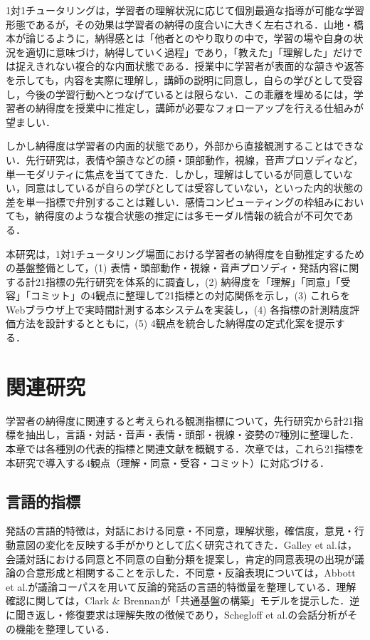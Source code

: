 \documentclass[Japanese]{dicomopapers}
\begin{document}
1対1チュータリングは，学習者の理解状況に応じて個別最適な指導が可能な学習形態であるが，その効果は学習者の納得の度合いに大きく左右される．山地・橋本\cite{Yamaji2012}が論じるように，納得感とは「他者とのやり取りの中で，学習の場や自身の状況を適切に意味づけ，納得していく過程」であり，「教えた」「理解した」だけでは捉えきれない複合的な内面状態である．授業中に学習者が表面的な頷きや返答を示しても，内容を実際に理解し，講師の説明に同意し，自らの学びとして受容し，今後の学習行動へとつなげているとは限らない．この乖離を埋めるには，学習者の納得度を授業中に推定し，講師が必要なフォローアップを行える仕組みが望ましい．

しかし納得度は学習者の内面的状態であり，外部から直接観測することはできない．先行研究は，表情や頷きなどの顔・頭部動作\cite{Craig2008}，視線\cite{Kendon1967}，音声プロソディ\cite{PonBarry2008}など，単一モダリティに焦点を当ててきた．しかし，理解はしているが同意していない，同意はしているが自らの学びとしては受容していない，といった内的状態の差を単一指標で弁別することは難しい．感情コンピューティング\cite{Picard1997}の枠組みにおいても，納得度のような複合状態の推定には多モーダル情報の統合が不可欠である．

本研究は，1対1チュータリング場面における学習者の納得度を自動推定するための基盤整備として，(1) 表情・頭部動作・視線・音声プロソディ・発話内容に関する計21指標の先行研究を体系的に調査し，(2) 納得度を「理解」「同意」「受容」「コミット」の4観点に整理して21指標との対応関係を示し，(3) これらをWebブラウザ上で実時間計測する本システムを実装し，(4) 各指標の計測精度評価方法を設計するとともに，(5) 4観点を統合した納得度の定式化案を提示する．

\section{関連研究}

学習者の納得度に関連すると考えられる観測指標について，先行研究から計21指標を抽出し，言語・対話・音声・表情・頭部・視線・姿勢の7種別に整理した．本章では各種別の代表的指標と関連文献を概観する．次章では，これら21指標を本研究で導入する4観点（理解・同意・受容・コミット）に対応づける．

\subsection{言語的指標}

発話の言語的特徴は，対話における同意・不同意，理解状態，確信度，意見・行動意図の変化を反映する手がかりとして広く研究されてきた．Galley et al.\cite{Galley2004}は，会議対話における同意と不同意の自動分類を提案し，肯定的同意表現の出現が議論の合意形成と相関することを示した．不同意・反論表現については，Abbott et al.\cite{Abbott2011}が議論コーパスを用いて反論的発話の言語的特徴量を整理している．理解確認に関しては，Clark \& Brennan\cite{Clark1991}が「共通基盤の構築」モデルを提示した．逆に聞き返し・修復要求は理解失敗の徴候であり，Schegloff et al.\cite{Schegloff1977}の会話分析がその機能を整理している．
\end{document}
